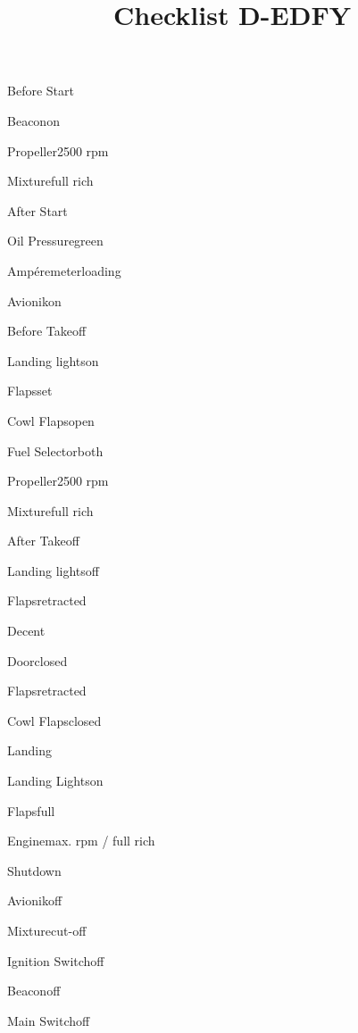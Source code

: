 \def\papersize{6}




\title{Checklist D-EDFY}

\begin{checklist}{Before Start}
  \item{Beacon}{on}
  \item{Propeller}{2500 rpm}
  \item{Mixture}{full rich}
\end{checklist}

\begin{checklist}{After Start}
  \item{Oil Pressure}{green}
  \item{Ampéremeter}{loading}
  \item{Avionik}{on}
\end{checklist}

\begin{checklist}{Before Takeoff}
  \item{Landing lights}{on}
  \item{Flaps}{set}
  \item{Cowl Flaps}{open}
  \item{Fuel Selector}{both}
  \item{Propeller}{2500 rpm}
  \item{Mixture}{full rich}
\end{checklist}

\begin{checklist}{After Takeoff}
  \item{Landing lights}{off}
  \item{Flaps}{retracted}
\end{checklist}

\begin{checklist}{Decent}
  \item{Door}{closed}
  \item{Flaps}{retracted}
  \item{Cowl Flaps}{closed}
\end{checklist}

\begin{checklist}{Landing}
  \item{Landing Lights}{on}
  \item{Flaps}{full}
  \item{Engine}{max. rpm / full rich}
\end{checklist}

  \begin{checklist}{Shutdown}
    \item{Avionik}{off}
    \item{Mixture}{cut-off}
    \item{Ignition Switch}{off}
    \item{Beacon}{off}
    \item{Main Switch}{off}
  \end{checklist}

